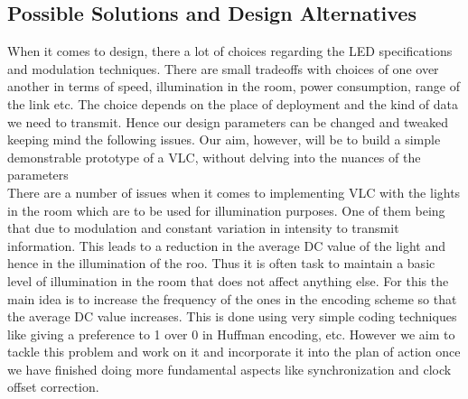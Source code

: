 \documentclass{article}
\begin{document}
\subsection{Possible Solutions and Design Alternatives}
When it comes to design, there a lot of choices regarding the LED specifications and modulation techniques. There are small tradeoffs with choices of one over another in terms of speed, illumination in the room, power consumption, range of the link etc. The choice depends on the place of deployment and the kind of data we need to transmit. Hence our design parameters can be changed and tweaked keeping mind the following issues. Our aim, however, will be to build a simple demonstrable prototype of a VLC, without delving into the nuances of the parameters\\ 

There are a number of issues when it comes to implementing VLC with the lights in the room which are to be used for illumination purposes. One of them being that due to modulation and constant variation in intensity to transmit information. This leads to a reduction in the average DC value of the light and hence in the illumination of the roo. Thus it is often task to maintain a basic level of illumination in the room that does not affect anything else. For this the main idea is to increase the frequency of the ones in the encoding scheme so that the average DC value increases. This is done using very simple coding techniques like giving a preference to 1 over 0 in Huffman encoding, etc. However we aim to tackle this problem and work on it and incorporate it into the plan of action once we have finished doing more fundamental aspects like synchronization and clock offset correction.
\end{document}
